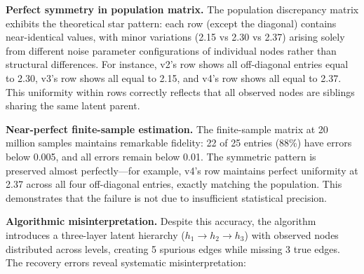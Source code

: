 \documentclass[11pt,a4paper]{article}
\numberwithin{equation}{section}
\begin{document}
\textbf{Perfect symmetry in population matrix.} The population discrepancy matrix exhibits the theoretical star pattern: each row (except the diagonal) contains near-identical values, with minor variations (2.15 vs 2.30 vs 2.37) arising solely from different noise parameter configurations of individual nodes rather than structural differences. For instance, v2's row shows all off-diagonal entries equal to 2.30, v3's row shows all equal to 2.15, and v4's row shows all equal to 2.37. This uniformity within rows correctly reflects that all observed nodes are siblings sharing the same latent parent.

\textbf{Near-perfect finite-sample estimation.} The finite-sample matrix at 20 million samples maintains remarkable fidelity: 22 of 25 entries (88\%) have errors below 0.005, and all errors remain below 0.01. The symmetric pattern is preserved almost perfectly—for example, v4's row maintains perfect uniformity at 2.37 across all four off-diagonal entries, exactly matching the population. This demonstrates that the failure is not due to insufficient statistical precision.

\textbf{Algorithmic misinterpretation.} Despite this accuracy, the algorithm introduces a three-layer latent hierarchy ($h_1 \to h_2 \to h_3$) with observed nodes distributed across levels, creating 5 spurious edges while missing 3 true edges. The recovery errors reveal systematic misinterpretation:
\end{document}
